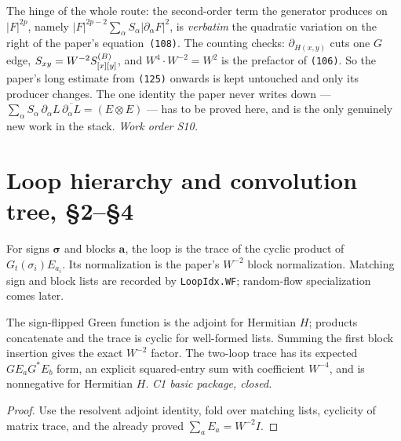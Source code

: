\begin{lemma}\label{lem:discharge}
  The hinge of the whole route: the second-order term the generator produces on
  $|F|^{2p}$, namely $|F|^{2p-2}\sum_\alpha S_\alpha|\partial_\alpha F|^2$, is
  \emph{verbatim} the quadratic variation on the right of the paper's
  equation~\texttt{(108)}.  The counting checks: $\partial_{H(x,y)}$ cuts one $G$
  edge, $S_{xy}=W^{-2}S^{(B)}_{[x][y]}$, and $W^4\cdot W^{-2}=W^2$ is the prefactor
  of \texttt{(106)}.  So the paper's long estimate from \texttt{(125)} onwards is
  kept untouched and only its producer changes.  The one identity the paper never
  writes down --- $\sum_\alpha S_\alpha\,\partial_\alpha L\,\overline{\partial_\alpha L}=(E\otimes E)$
  --- has to be proved here, and is the only genuinely new work in the stack.
  \emph{Work order S10.}
\end{lemma}

\chapter{Loop hierarchy and convolution tree, \S2--\S4}

\begin{definition}\label{def:loops}
  \leanok
  For signs $\boldsymbol\sigma$ and blocks $\boldsymbol a$, the loop is the
  trace of the cyclic product of $G_t(\sigma_i)E_{a_i}$.  Its normalization is
  the paper's $W^{-2}$ block normalization. Matching sign and block lists are
  recorded by \texttt{LoopIdx.WF}; random-flow specialization comes later.
\end{definition}

\begin{lemma}
  \label{lem:loop-basic}
  \leanok
  The sign-flipped Green function is the adjoint for Hermitian $H$; products
  concatenate and the trace is cyclic for well-formed lists. Summing the
  first block insertion gives the exact $W^{-2}$ factor. The two-loop trace
  has its expected $G E_a G^* E_b$ form, an explicit squared-entry sum with
  coefficient $W^{-4}$, and is nonnegative for Hermitian $H$.
  \emph{C1 basic package, closed.}
\end{lemma}
\begin{proof}\leanok
  Use the resolvent adjoint identity, fold over matching lists, cyclicity of
  matrix trace, and the already proved $\sum_a E_a=W^{-2}I$.
\end{proof}

